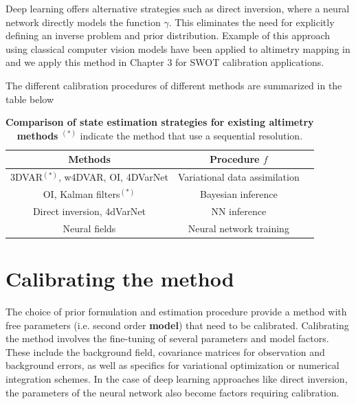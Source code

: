 \begin{bibunit}
Deep learning offers alternative strategies such as direct inversion, where a neural network directly models the function $\gamma$. This eliminates the need for explicitly defining an inverse problem and prior distribution. Example of this approach using classical computer vision models have been applied to altimetry mapping in \cite{manucharyanDeepLearningApproach2021a} and we apply this method in Chapter 3 for SWOT calibration applications.


The different calibration procedures of different methods are summarized in the table below 

\begin{table}
  \centering
  \begin{tabular}{|c|c|c|}
\hline
    Methods & Procedure $f$ \\
\hline
    3DVAR$^{(*)}$, w4DVAR, OI, 4DVarNet & Variational data assimilation \\
    OI, Kalman filters$^{(*)}$ & Bayesian inference \\
    Direct inversion, 4dVarNet & NN inference \\
    Neural fields & Neural network training \\
\hline
\end{tabular}
\caption{\textbf{Comparison of state estimation strategies for existing altimetry methods} $^{(*)}$ indicate the method that use a sequential resolution.}
\end{table}

%




\section{Calibrating the method}
  \label{c2sec:calib}
The choice of prior formulation and estimation procedure provide a method with free parameters (i.e. second order \textbf{model}) that need to be calibrated. 
Calibrating the method involves the fine-tuning of several parameters and model factors. These include the background field, covariance matrices for observation and background errors, as well as specifics for variational optimization or numerical integration schemes. In the case of deep learning approaches like direct inversion, the parameters of the neural network also become factors requiring calibration.



\end{bibunit}
